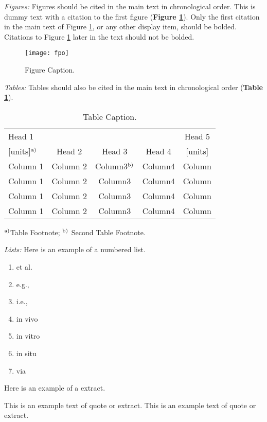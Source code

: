 \documentclass{ar-1col}
\begin{document}
{\itshape Figures:} Figures should be cited in the main text in chronological order. This is dummy text with a citation to the first figure (\textbf{Figure \ref{fig1}}). Only the first citation in the main text of  Figure \ref{fig1}, or any other display item, should be bolded. Citations to Figure \ref{fig1} later in the text should not be bolded. 

\begin{figure}
\texttt{[image: fpo]}
\caption{Figure Caption.}
\label{fig1}
\end{figure}

{\itshape Tables:} Tables should also be cited in the main text in chronological order (\textbf {Table \ref{tab1}}).
\begin{table}
\caption{Table Caption.}
\label{tab1}
\begin{center}
\begin{tabular}{@{}l|c|c|c|c@{}}
\hline
Head 1 &&&&Head 5\\
{[}units]$^{\rm a)}$ &Head 2 &Head 3 &Head 4 &{[}units]\\
\hline
Column 1 &Column 2 &Column3$^{\rm b)}$ &Column4 &Column\\
Column 1 &Column 2 &Column3 &Column4 &Column\\
Column 1 &Column 2 &Column3 &Column4 &Column\\
Column 1 &Column 2 &Column3 &Column4 &Column\\
\hline
\end{tabular}
\end{center}
\begin{tabnote}
$^{\rm a)}$Table Footnote; $^{\rm b)}$ Second Table Footnote.
\end{tabnote}
\end{table}

{\itshape Lists:} Here is an example of a numbered list.
\begin{enumerate}
\item et al.
\item e.g.,
\item i.e.,
\item in vivo
\item in vitro
\item in situ
\item via
\end{enumerate}
Here is an example of a extract.
\begin{extract}
This is an example text of quote or extract.
This is an example text of quote or extract.
\end{extract}
\end{document}
